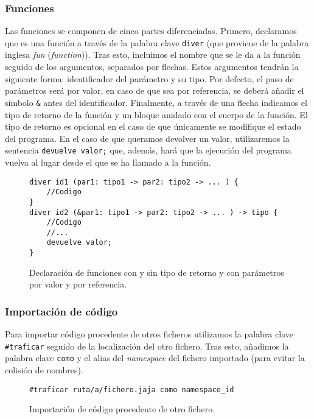 \subsubsection{Funciones}
Las funciones se componen de cinco partes diferenciadas. Primero, declaramos que
es una función a través de la palabra clave \lstinline{diver} (que proviene de
la palabra inglesa \textit{fun} (\textit{function})). Tras esto, incluimos el
nombre que se le da a la función seguido de los argumentos, separados por
flechas. Estos argumentos tendrán la siguiente forma: identificador del
parámetro y su tipo. Por defecto, el paso de parámetros será por valor, en caso
de que sea por referencia, se deberá añadir el símbolo \lstinline{&} antes del
identificador. Finalmente, a través de una flecha indicamos el tipo de retorno
de la función y un bloque anidado con el cuerpo de la función. El tipo de
retorno es opcional en el caso de que únicamente se modifique el estado del
programa. En el caso de que queramos devolver un valor, utilizaremos la
sentencia \lstinline{devuelve valor;} que, además, hará que la ejecución del
programa vuelva al lugar desde el que se ha llamado a la función.
\begin{figure}[htbp]
    \centering
    \begin{lstlisting}
diver id1 (par1: tipo1 -> par2: tipo2 -> ... ) {
    //Codigo
}
diver id2 (&par1: tipo1 -> par2: tipo2 -> ... ) -> tipo {
    //Codigo
    //...
    devuelve valor;
}
    \end{lstlisting}
    \caption{Declaración de funciones con y sin tipo de retorno y con parámetros
    por valor y por referencia.}
\end{figure}

\subsubsection{Importación de código}
Para importar código procedente de otros ficheros utilizamos la palabra clave
\lstinline{#traficar} seguido de la localización del otro fichero. Tras esto,
añadimos la palabra clave \lstinline{como} y el alias del \textit{namespace} del
fichero importado (para evitar la colisión de nombres).
\begin{figure}[htbp]
    \centering
    \begin{lstlisting}
#traficar ruta/a/fichero.jaja como namespace_id
    \end{lstlisting}
    \caption{Importación de código procedente de otro fichero.}
\end{figure}

